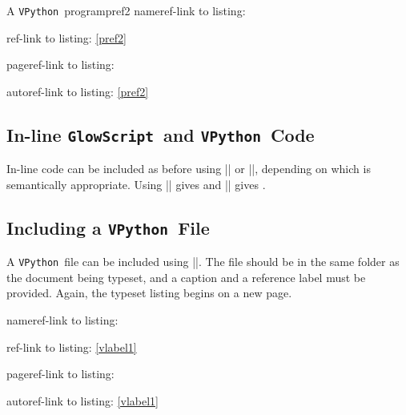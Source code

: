 \documentclass{article}
\newcommand*{\GlowScript}{\texttt{GlowScript}}        %
\newcommand*{\VPython}{\texttt{VPython}}              %
\begin{document}
\begin{glowscriptblock}{A \VPython\ program}{pref2}
nameref-link to listing: 

ref-link to listing: \ref{pref2}

pageref-link to listing: \pageref{pref2}

autoref-link to listing: \autoref{pref2}

\subsection{In-line \GlowScript\ and \VPython\ Code}
In-line code can be included as before using || or 
||, depending on which is semantically appropriate. Using \newline
|| gives \newline
{} and \newline
|| gives \newline
{}.

\subsection{Including a \VPython\ File}
A \VPython\ file can be included using ||. The file 
should be in the same folder as the document being typeset, and a caption and a reference 
label must be provided. Again, the typeset listing begins on a new page.


nameref-link to listing: 

ref-link to listing: \ref{vlabel1}

pageref-link to listing: \pageref{vlabel1}

autoref-link to listing: \autoref{vlabel1}


\end{glowscriptblock}
\end{document}

